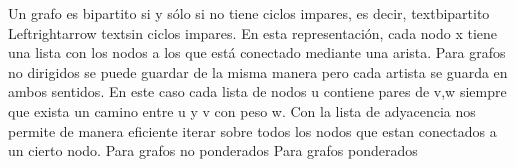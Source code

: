 {}\markdownRendererHardLineBreak
{}Un grafo es bipartito si y sólo si no tiene ciclos impares, es decir, \markdownRendererDollarSign{}\markdownRendererBackslash{}text\markdownRendererLeftBrace{}bipartito\markdownRendererRightBrace{} \markdownRendererBackslash{}Leftrightarrow \markdownRendererBackslash{}text\markdownRendererLeftBrace{}sin ciclos impares\markdownRendererRightBrace{}\markdownRendererDollarSign{}.\markdownRendererParagraphSeparator
{}
\markdownRendererSectionEnd \markdownRendererSectionBegin
{}\markdownRendererInterblockSeparator
{}\markdownRendererSectionBegin
{}\markdownRendererInterblockSeparator
{}\markdownRendererSectionBegin
{}\markdownRendererInterblockSeparator
{}En esta representación, cada nodo \markdownRendererDollarSign{}x\markdownRendererDollarSign{} tiene una lista con los nodos a los que está conectado mediante una arista. Para grafos no dirigidos se puede guardar de la misma manera pero cada artista se guarda en ambos sentidos.\markdownRendererInterblockSeparator
{}\markdownRendererInterblockSeparator
{}
\markdownRendererSectionEnd \markdownRendererSectionBegin
{}\markdownRendererInterblockSeparator
{}En este caso cada lista de nodos \markdownRendererDollarSign{}u\markdownRendererDollarSign{} contiene pares de \markdownRendererDollarSign{}v,w\markdownRendererDollarSign{} siempre que exista un camino entre \markdownRendererDollarSign{}u\markdownRendererDollarSign{} y \markdownRendererDollarSign{}v\markdownRendererDollarSign{} con peso \markdownRendererDollarSign{}w\markdownRendererDollarSign{}.\markdownRendererInterblockSeparator
{}\markdownRendererInterblockSeparator
{}Con la lista de adyacencia nos permite de manera eficiente iterar sobre todos los nodos que estan conectados a un cierto nodo.\markdownRendererParagraphSeparator
{}Para grafos no ponderados\markdownRendererInterblockSeparator
{}\markdownRendererInterblockSeparator
{}Para grafos ponderados\markdownRendererInterblockSeparator
{}\markdownRendererInterblockSeparator
